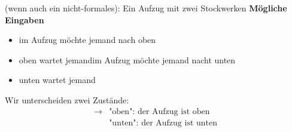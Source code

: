 \documentclass[runningheads,deutsch]{llncs}
\begin{document}
\begin{example} (wenn auch ein nicht-formales): Ein Aufzug mit zwei Stockwerken
    \textbf{Mögliche Eingaben}
    \begin{itemize}
        \item im Aufzug möchte jemand nach oben
        \item oben wartet jemandim Aufzug möchte jemand nacht unten
        \item unten wartet jemand
    \end{itemize}

    Wir unterscheiden zwei Zustände:
    \begin{align*}
        \rightarrow & \text{"oben": der Aufzug ist oben} \\
        & \text{"unten": der Aufzug ist unten}
    \end{align*}

    \begin{center}        
    \end{center}

\end{example}
\end{document}
